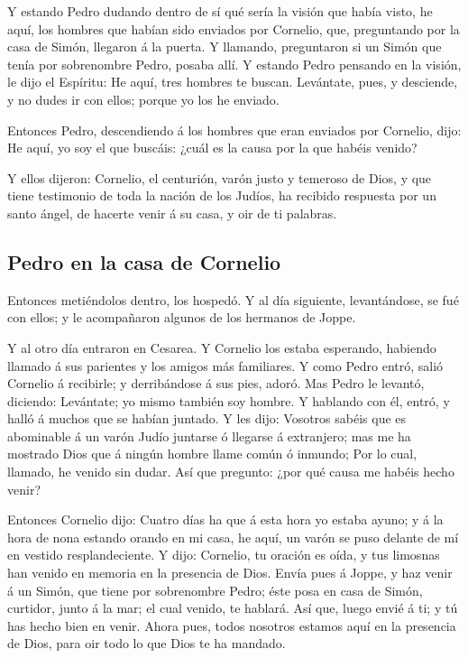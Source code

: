  Y estando Pedro dudando dentro de sí qué sería la visión
que había visto, he aquí, los hombres que habían sido enviados por
Cornelio, que, preguntando por la casa de Simón, llegaron á la puerta.
 Y llamando, preguntaron si un Simón que tenía por
sobrenombre Pedro, posaba allí.  Y estando Pedro pensando
en la visión, le dijo el Espíritu: He aquí, tres hombres te buscan.
 Levántate, pues, y desciende, y no dudes ir con ellos;
porque yo los he enviado.

 Entonces Pedro, descendiendo á los hombres que eran
enviados por Cornelio, dijo: He aquí, yo soy el que buscáis: ¿cuál es la
causa por la que habéis venido?

 Y ellos dijeron: Cornelio, el centurión, varón justo y
temeroso de Dios, y que tiene testimonio de toda la nación de los
Judíos, ha recibido respuesta por un santo ángel, de hacerte venir á su
casa, y oir de ti palabras.

\hypertarget{pedro-en-la-casa-de-cornelio}{%
\subsection{Pedro en la casa de
Cornelio}\label{pedro-en-la-casa-de-cornelio}}

 Entonces metiéndolos dentro, los hospedó. Y al día
siguiente, levantándose, se fué con ellos; y le acompañaron algunos de
los hermanos de Joppe.

 Y al otro día entraron en Cesarea. Y Cornelio los estaba
esperando, habiendo llamado á sus parientes y los amigos más familiares.
 Y como Pedro entró, salió Cornelio á recibirle; y
derribándose á sus pies, adoró.  Mas Pedro le levantó,
diciendo: Levántate; yo mismo también soy hombre.  Y
hablando con él, entró, y halló á muchos que se habían juntado.
 Y les dijo: Vosotros sabéis que es abominable á un varón
Judío juntarse ó llegarse á extranjero; mas me ha mostrado Dios que á
ningún hombre llame común ó inmundo;  Por lo cual, llamado,
he venido sin dudar. Así que pregunto: ¿por qué causa me habéis hecho
venir?

 Entonces Cornelio dijo: Cuatro días ha que á esta hora yo
estaba ayuno; y á la hora de nona estando orando en mi casa, he aquí, un
varón se puso delante de mí en vestido resplandeciente.  Y
dijo: Cornelio, tu oración es oída, y tus limosnas han venido en memoria
en la presencia de Dios.  Envía pues á Joppe, y haz venir á
un Simón, que tiene por sobrenombre Pedro; éste posa en casa de Simón,
curtidor, junto á la mar; el cual venido, te hablará.  Así
que, luego envié á ti; y tú has hecho bien en venir. Ahora pues, todos
nosotros estamos aquí en la presencia de Dios, para oir todo lo que Dios
te ha mandado.

